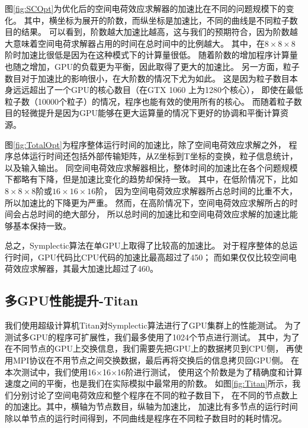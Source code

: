 图\ref{fig:SCOpt}为优化后的空间电荷效应求解器的加速比在不同的问题规模下的变化。
其中，横坐标为展开的阶数，而纵坐标是加速比，不同的曲线是不同粒子数目的结果。
可以看到，阶数越大加速比越高，这与我们的预期符合，因为阶数越大意味着空间电荷求解器占用的时间在总时间中的比例越大。
其中，在$8\times8\times8$阶时加速比很低是因为在这种模式下的计算量很低。
随着阶数的增加程序计算量也随之增加，GPU的负载更为平衡，因此取得了更大的加速比。
另一方面，粒子数目对于加速比的影响很小，在大阶数的情况下尤为如此。
这是因为粒子数目本身远远超出了一个GPU的核心数目（在GTX 1060 上为1280个核心），
即使在最低粒子数（10000个粒子）的情况，程序也能有效的使用所有的核心。
而随着粒子数目的轻微提升是因为GPU能够在更大运算量的情况下更好的协调和平衡计算资源。

图\ref{fig:TotalOpt}为程序整体运行时间的加速比，除了空间电荷效应求解之外，
程序总体运行时间还包括外部传输矩阵，从Z坐标到T坐标的变换，粒子信息统计，以及输入输出。
同空间电荷效应求解器相比，整体时间的加速比在各个问题规模下都略有下降，但是加速比变化的趋势却保持一致。
其中，在低阶情况下，比如$8\times8\times8$阶或$16\times16\times16$阶，
因为空间电荷效应求解器所占总时间的比重不大，所以加速比的下降更为严重。
然而，在高阶情况下，空间电荷效应求解所占的时间会占总时间的绝大部分，
所以总时间的加速比和空间电荷效应求解的加速比能够基本保持一致。

总之，Symplectic算法在单GPU上取得了比较高的加速比。
对于程序整体的总运行时间，GPU代码比CPU代码的加速比最高超过了450；
而如果仅仅比较空间电荷效应求解器，其最大加速比超过了460。

\subsection{多GPU性能提升-Titan}
我们使用超级计算机Titan对Symplectic算法进行了GPU集群上的性能测试。
为了测试多GPU的程序可扩展性，我们最多使用了1024个节点进行测试。
其中，为了在不同节点的GPU上交换信息，我们需要先把GPU上的数据拷贝到CPU侧，
再使用MPI协议在不用节点之间交换数据，最后再将交换后的信息拷贝回GPU侧。
在本次测试中，我们使用16$\times$16$\times$16阶进行测试，
使用这个阶数是为了精确度和计算速度之间的平衡，也是我们在实际模拟中最常用的阶数。
如图\ref{fig:Titan}所示，我们分别讨论了空间电荷效应和整个程序在不同的粒子数目下，
在不同的节点数上的加速比。其中，横轴为节点数目，纵轴为加速比，
加速比有多节点的运行时间除以单节点的运行时间得到，不同曲线是程序在不同粒子数目时的耗时情况。


